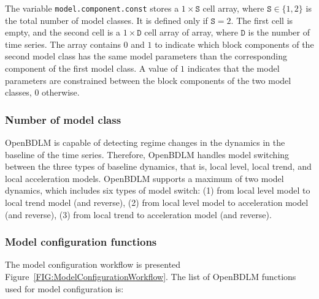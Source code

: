 The variable \lstinline[basicstyle = \mlttfamily]!model.component.const! stores a $1\times \mathtt{S}$ cell array, where $\mathtt{S} \in \{1, 2 \}$ is the total number of model classes.
It is defined only if $\mathtt{S} = 2$.
The first cell is empty, and the second cell is a $1\times \mathtt{D}$ cell array of array, where $\mathtt{D}$ is the number of time series.
The array contains $0$ and $1$ to indicate which block components of the second model class has the same model parameters than the corresponding component of the first model class. 
A value of $1$ indicates that the model parameters are constrained between the block components of the two model classes, $0$ otherwise.

\subsubsection{Number of model class}

OpenBDLM is capable of detecting regime changes in the dynamics in the baseline of the time series. Therefore, OpenBDLM handles model switching between the three types of baseline dynamics, that is, local level, local trend, and local acceleration models. OpenBDLM supports a maximum of two model dynamics, which includes six types of model switch: (1) from local level model to local trend model (and reverse), (2) from local level model to acceleration model (and reverse), (3) from local trend to acceleration model (and reverse).


\subsubsection{Model configuration functions}

The model configuration workflow is presented Figure~\ref{FIG:ModelConfigurationWorkflow}. The list of OpenBDLM functions used for model configuration is:

